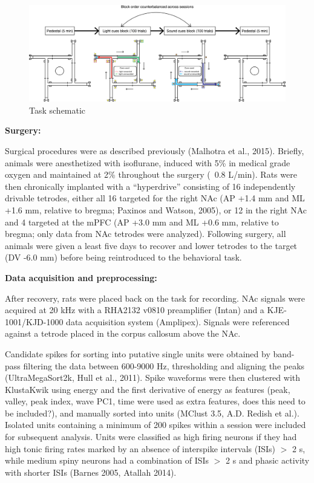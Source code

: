 \documentclass[11pt]{article}
\begin{document}
\begin{figure}[h]
\centering
\includegraphics[width=\textwidth]{Fig 2 - Schematic task.png}
\caption{Task schematic}
\label{fig:task}
\end{figure}

{\bf Surgery:}

Surgical procedures were as described previously (Malhotra et al., 2015). Briefly, animals were anesthetized with isoflurane, induced with 5\% in medical grade oxygen and maintained at 2\% throughout the surgery (~0.8 L/min). Rats were then chronically implanted with a “hyperdrive” consisting of 16 independently drivable tetrodes, either all 16 targeted for the right NAc (AP +1.4 mm and ML +1.6 mm, relative to bregma; Paxinos and Watson, 2005), or 12 in the right NAc and 4 targeted at the mPFC (AP +3.0 mm and ML +0.6 mm, relative to bregma; only data from NAc tetrodes were analyzed). Following surgery, all animals were given a least five days to recover and lower tetrodes to the target (DV -6.0 mm) before being reintroduced to the behavioral task.

{\bf Data acquisition and preprocessing:}

After recovery, rats were placed back on the task for recording. NAc signals were acquired at 20 kHz with a RHA2132 v0810 preamplifier (Intan) and a KJE-1001/KJD-1000 data acquisition system (Amplipex). Signals were referenced against a tetrode placed in the corpus callosum above the NAc.

Candidate spikes for sorting into putative single units were obtained by band-pass filtering the data between 600-9000 Hz, thresholding and aligning the peaks (UltraMegaSort2k, Hull et al., 2011). Spike waveforms were then clustered with KlustaKwik using energy and the first derivative of energy as features (peak, valley, peak index, wave PC1, time were used as extra features, does this need to be included?), and manually sorted into units (MClust 3.5, A.D. Redish et al.). Isolated units containing a minimum of 200 spikes within a session were included for subsequent analysis. Units were classified as high firing neurons if they had high tonic firing rates marked by an absence of interspike intervals (ISIs) $>$ 2 s, while medium spiny neurons had a combination of ISIs $>$ 2 s and phasic activity with shorter ISIs (Barnes 2005, Atallah 2014). 
\end{document}
